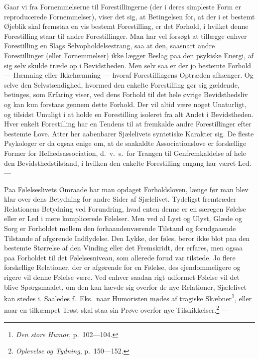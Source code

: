 \documentclass[12pt]{article}
\newcommand{\opage}[1]{\marginnote{\footnotesize\textit{[#1]}}}
\begin{document}
Gaar vi fra Fornemmelserne til Forestillingerne (der i deres simpleste Form er
reproducerede Fornemmelser), viser det sig, at Betingelsen for, at der i et
bestemt Øjeblik skal fremstaa en vis bestemt Forestilling, er det Forhold, i
hvilket denne Forestilling staar til andre Forestillinger.
\opage{19} Man har vel forsøgt at tillægge enhver Forestilling en Slags
Selvopholdelsestrang, saa at den, saasnart andre Forestillinger (eller
Fornemmelser) ikke lægger Beslag paa den psykiske Energi, \guillemotright{}af sig
selv\guillemotleft{} skulde træde op i Bevidstheden. Men selv saa er der jo
bestemte Forhold --- Hæmning eller Ikkehæmning --- hvoraf Forestillingens
Optræden afhænger. Og selve den Selvstændighed, hvormed den enkelte Forestilling
gør sig gældende, betinges, som Erfaring viser, ved dens Forhold til det hele
øvrige Bevidsthedsliv og kan kun forstaas gennem dette Forhold. Der vil altid
være noget Unaturligt, og tilsidst Umuligt i at holde en Forestilling isoleret
fra alt Andet i Bevidstheden. Hver enkelt Forestilling har en Tendens til at
fremkalde andre Forestillinger efter bestemte Love. Atter her aabenbarer
Sjælelivets syntetiske Karakter sig. De fleste Psykologer er da ogsaa enige om,
at de saakaldte Associationslove er forskellige Former for Helhedsassociation,
d.\ v.\ s.\ for Trangen til Genfremkaldelse af hele den Bevidsthedstilstand, i
hvilken den enkelte Forestilling engang har været Led. ---

Paa Følelseslivets Omraade har man opdaget Forholdsloven, længe før man blev
klar over dens Betydning for andre Sider af Sjælelivet. Tydeligst fremtræder
Relationens Betydning ved Forundring, hvad enten denne er en særegen Følelse
eller er Led i mere komplicerede Følelser. Men ved al Lyst og Ulyst, Glæde og
Sorg er Forholdet mellem den forhaandenværende Tilstand og forudgaaende Tilstande
af afgørende Indflydelse. Den Lykke, der føles, beror ikke blot paa den bestemte
Størrelse af den Vinding eller det Fremskridt, der erfares, men ogsaa paa
Forholdet til det Følelsesniveau, som allerede forud var tilstede. Jo flere
forskellige Relationer, der er afgørende for en Følelse, des ejendommeligere og
rigere vil denne Følelse
\opage{20} \setcounter{footnote}{0}%
være. Ved enhver saadan rigt udformet Følelse vil det blive Spørgsmaalet, om den
kan hævde sig overfor de nye Relationer, Sjælelivet kan stedes i. Saaledes f.\
Eks.\ naar Humoristen mødes af tragiske Skæbner\footnote{\textit{Den store
  Humor}, p.~102---104.}, eller naar en tilkæmpet Trøst skal staa sin Prøve
overfor nye Tilskikkelser.\footnote{\textit{Oplevelse og Tydning},
  p.~150---152.} ---
\end{document}
